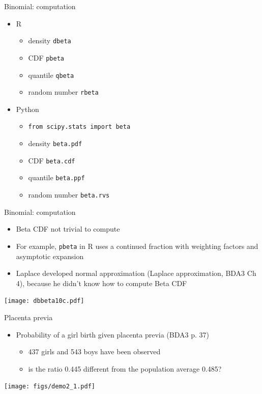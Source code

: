 \documentclass[english,t]{beamer}
\begin{document}
\begin{frame}{Binomial: computation}

  \begin{itemize}
  \item R
    \begin{itemize}
    \item density {\tt dbeta}
    \item CDF {\tt pbeta}
    \item quantile {\tt qbeta}
    \item random number {\tt rbeta}
    \end{itemize}
  \item Python
    \begin{itemize}
    \item {\tt from scipy.stats import beta}
    \item density {\tt beta.pdf}
    \item CDF {\tt beta.cdf}
    \item quantile {\tt beta.ppf}
    \item random number {\tt beta.rvs}
    \end{itemize}
  \end{itemize}

\end{frame}

\begin{frame}{Binomial: computation}

  \begin{itemize}
  \item Beta CDF not trivial to compute
  \item For example, {\tt pbeta} in R uses a continued fraction with
    weighting factors and asymptotic expansion
  \item Laplace developed normal approximation (Laplace
    approximation, BDA3 Ch 4), because he didn't know how to compute Beta CDF
  \end{itemize}

  \begin{center}
    {\texttt{[image: dbbeta10c.pdf]}}
  \end{center}
  
\end{frame}

\begin{frame}{Placenta previa}

  \begin{itemize}
  \item Probability of a girl birth given placenta previa (BDA3 p. 37)
    \begin{itemize}
    \item 437 girls and 543 boys have been observed
    \item is the ratio 0.445 different from the population average 0.485?
    \end{itemize}
  \end{itemize}
  \pause
  \texttt{[image: figs/demo2\_1.pdf]}
\end{frame}
\end{document}
